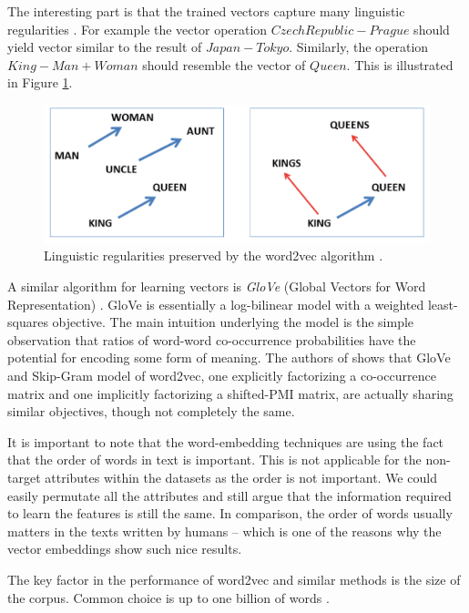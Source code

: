 The interesting part is that the trained vectors capture many linguistic regularities \cite{MikolovLinguisticRegularities}. For example the vector operation $Czech Republic - Prague$ should yield vector similar to the result of $Japan - Tokyo$. Similarly, the operation $King - Man + Woman$ should resemble the vector of $Queen$. This is illustrated in Figure \ref{fig:word2vec}.

\begin{figure}
	\includegraphics[width=14cm]{Images/word2vec.png}
	\centering
	\caption{Linguistic regularities preserved by the word2vec algorithm \cite{word2vec,mikolovDistirbutedRepresentationsOfWords}.}
	\label{fig:word2vec}	
\end{figure}

A similar algorithm for learning vectors is \emph{GloVe} (Global Vectors for Word Representation) \cite{glove}. GloVe is essentially a log-bilinear model with a weighted least-squares objective. The main intuition underlying the model is the simple observation that ratios of word-word co-occurrence probabilities have the potential for encoding some form of meaning.
The authors of \cite{linkingGloveWithWord2Vec} shows that GloVe and Skip-Gram model of word2vec, one explicitly factorizing a co-occurrence matrix and one implicitly factorizing a shifted-PMI matrix, are actually sharing similar objectives, though not completely the same.

It is important to note that the word-embedding techniques are using the fact that the order of words in text is important. This is not applicable for the non-target attributes within the datasets as the order is not important. We could easily permutate all the attributes and still argue that the information required to learn the features is still the same. In comparison, the order of words usually matters in the texts written by humans -- which is one of the reasons why the vector embeddings show such nice results.

The key factor in the performance of word2vec and similar methods is the size of the corpus. Common choice is up to one billion of words \cite{word2vec}.


